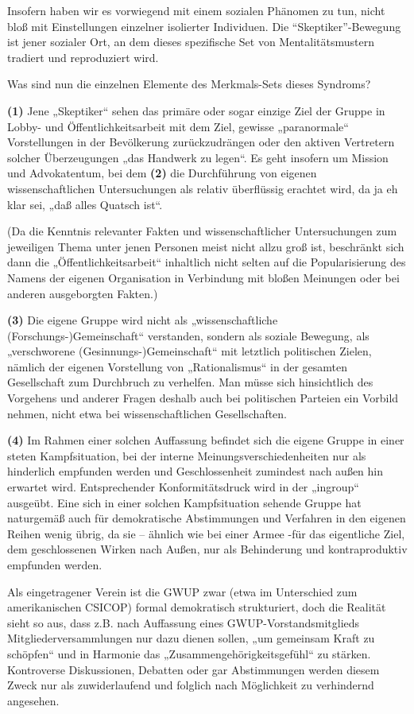 Insofern haben wir es vorwiegend mit einem sozialen Phänomen zu tun,
nicht bloß mit Einstellungen einzelner isolierter Individuen. Die
``Skeptiker''-Bewegung ist jener sozialer Ort, an dem dieses spezifische
Set von Mentalitätsmustern tradiert und reproduziert wird.

Was sind nun die einzelnen Elemente des Merkmals-Sets dieses Syndroms?

\textbf{(1)} Jene „Skeptiker`` sehen das primäre oder sogar einzige Ziel
der Gruppe in Lobby- und Öffentlichkeitsarbeit mit dem Ziel, gewisse
„paranormale`` Vorstellungen in der Bevölkerung zurückzudrängen oder den
aktiven Vertretern solcher Überzeugungen „das Handwerk zu legen``. Es
geht insofern um Mission und Advokatentum, bei dem \textbf{(2)} die
Durchführung von eigenen wissenschaftlichen Untersuchungen als relativ
überflüssig erachtet wird, da ja eh klar sei, „daß alles Quatsch ist``.

(Da die Kenntnis relevanter Fakten und wissenschaftlicher Untersuchungen
zum jeweiligen Thema unter jenen Personen meist nicht allzu groß ist,
beschränkt sich dann die „Öffentlichkeitsarbeit`` inhaltlich nicht
selten auf die Popularisierung des Namens der eigenen Organisation in
Verbindung mit bloßen Meinungen oder bei anderen ausgeborgten Fakten.)

\textbf{(3)} Die eigene Gruppe wird nicht als „wissenschaftliche
(Forschungs-)Gemeinschaft`` verstanden, sondern als soziale Bewegung,
als „verschworene (Gesinnungs-)Gemeinschaft`` mit letztlich politischen
Zielen, nämlich der eigenen Vorstellung von „Rationalismus`` in der
gesamten Gesellschaft zum Durchbruch zu verhelfen. Man müsse sich
hinsichtlich des Vorgehens und anderer Fragen deshalb auch bei
politischen Parteien ein Vorbild nehmen, nicht etwa bei
wissenschaftlichen Gesellschaften.

\textbf{(4)} Im Rahmen einer solchen Auffassung befindet sich die eigene
Gruppe in einer steten Kampfsituation, bei der interne
Meinungsverschiedenheiten nur als hinderlich empfunden werden und
Geschlossenheit zumindest nach außen hin erwartet wird. Entsprechender
Konformitätsdruck wird in der „ingroup`` ausgeübt. Eine sich in einer
solchen Kampfsituation sehende Gruppe hat naturgemäß auch für
demokratische Abstimmungen und Verfahren in den eigenen Reihen wenig
übrig, da sie -- ähnlich wie bei einer Armee -für das eigentliche Ziel,
dem geschlossenen Wirken nach Außen, nur als Behinderung und
kontraproduktiv empfunden werden.

Als eingetragener Verein ist die GWUP zwar (etwa im Unterschied zum
amerikanischen CSICOP) formal demokratisch strukturiert, doch die
Realität sieht so aus, dass z.B. nach Auffassung eines
GWUP-Vorstandsmitglieds Mitgliederversammlungen nur dazu dienen sollen,
„um gemeinsam Kraft zu schöpfen`` und in Harmonie das
„Zusammengehörigkeitsgefühl`` zu stärken. Kontroverse Diskussionen,
Debatten oder gar Abstimmungen werden diesem Zweck nur als
zuwiderlaufend und folglich nach Möglichkeit zu verhindernd angesehen.

